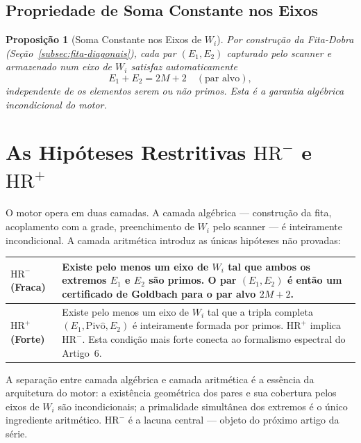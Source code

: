 \documentclass[12pt,a4paper]{article}
\newtheorem{proposition}[theorem]{Proposição}
\theoremstyle{definition}
\newcommand{\HRm}{\mathrm{HR}^{-}}
\newcommand{\HRp}{\mathrm{HR}^{+}}
\begin{document}
\subsection{Propriedade de Soma Constante nos Eixos}
\label{subsec:scanner-soma}

\begin{proposition}[Soma Constante nos Eixos de $W_i$]
	Por construção da Fita-Dobra (Seção~\ref{subsec:fita-diagonais}), cada
	par $(E_1, E_2)$ capturado pelo scanner e armazenado num eixo de $W_i$
	satisfaz automaticamente
	\[
		E_1 + E_2 = 2M{+}2 \quad (\text{par alvo}),
	\]
	independente de os elementos serem ou não primos. Esta é a garantia
	algébrica incondicional do motor.
\end{proposition}

\section{As Hipóteses Restritivas \texorpdfstring{$\HRm$}{HR-} e \texorpdfstring{$\HRp$}{HR+}}
\label{sec:HR}

O motor opera em duas camadas. A camada algébrica — construção da fita,
acoplamento com a grade, preenchimento de $W_i$ pelo scanner — é
inteiramente incondicional. A camada aritmética introduz as únicas
hipóteses não provadas:

\renewcommand{\arraystretch}{1.5}
\begin{center}
\begin{tabular}{>{\bfseries}p{2.8cm} p{10cm}}
	\toprule
	$\HRm$ (Fraca) &
		Existe pelo menos um eixo de $W_i$ tal que ambos os extremos $E_1$ e
		$E_2$ são primos. O par $(E_1, E_2)$ é então um certificado de Goldbach
		para o par alvo $2M{+}2$. \\
	\midrule
	$\HRp$ (Forte) &
		Existe pelo menos um eixo de $W_i$ tal que a tripla completa
		$(E_1, \mathrm{Piv\hat{o}}, E_2)$ é inteiramente formada por primos.
		$\HRp$ implica $\HRm$. Esta condição mais forte conecta ao formalismo
		espectral do Artigo~6. \\
	\bottomrule
\end{tabular}
\end{center}

\medskip\noindent A separação entre camada algébrica e camada aritmética é
a essência da arquitetura do motor: a existência geométrica dos pares e sua
cobertura pelos eixos de $W_i$ são incondicionais; a primalidade simultânea
dos extremos é o único ingrediente aritmético. $\HRm$ é a lacuna central —
objeto do próximo artigo da série.
\end{document}
